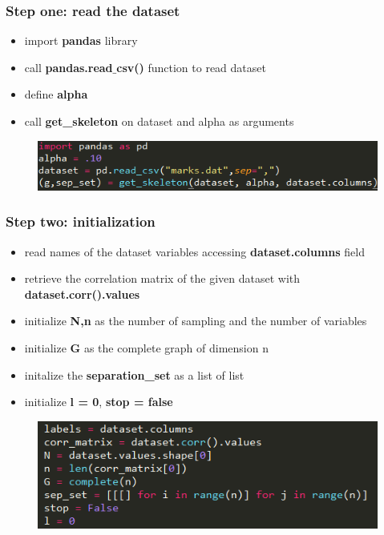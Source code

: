 \documentclass[xcolor ={table,usenames,dvipsnames}]{beamer}
\theoremstyle{definition}
\begin{document}
	\begin{frame}
		\frametitle{Step one: read the dataset}
		\begin{itemize}
			\item import \textbf{pandas} library
			\item call \textbf{pandas.read$\_$csv()} function to read dataset
			\item define \textbf{alpha}
			\item call \textbf{get\_skeleton} on dataset and alpha as arguments
		\end{itemize}
		\begin{figure}[h!]
			\centering
			\includegraphics[scale=0.82]{img/dataset.PNG}
		\end{figure}
		
	\end{frame}
	\begin{frame}
\frametitle{Step two: initialization}
\begin{itemize}
	\item read names of the dataset variables accessing \textbf{dataset.columns} field
	\item retrieve the correlation matrix of the given dataset with \textbf{dataset.corr().values}
	\item initialize \textbf{N,n} as the number of sampling and the number of variables
	\item initialize \textbf{G} as the complete graph of dimension n
	\item initalize the \textbf{separation\_set} as a list of list
	\item initialize \textbf{l = 0}, \textbf{stop = false}
\end{itemize}
	\begin{figure}[h!]
		\centering
		\includegraphics[scale=0.52]{img/initialization.PNG}
	\end{figure}

\end{frame}
\end{document}
